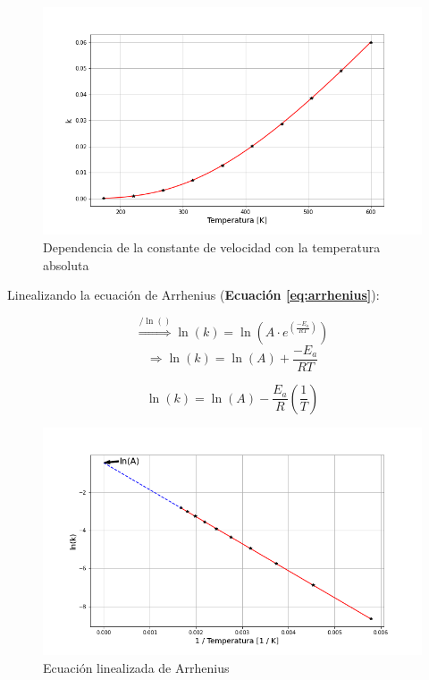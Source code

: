             \begin{figure}
                \centering
                \includegraphics[width=.7\textwidth]{img/graficos/arrhenius_exp.png}
                \caption{Dependencia de la constante de velocidad con la temperatura absoluta}
                \label{fig:arrhenius_exp}
            \end{figure}
            
            Linealizando la ecuación de Arrhenius (\textbf{Ecuación \ref{eq:arrhenius}}):
            
            \[\overset{/ \ln({})}{\Rightarrow} \ln({k}) = \ln({A\cdot e^{\left ( \frac{-E_{a}}{RT} \right )}})\]
            \[\Rightarrow \ln({k}) = \ln({A}) + \frac{-E_{a}}{RT}\]
            
            \begin{equation}
            \label{eq:arrhenius_lineal}
                \ln({k}) = \ln({A}) - \frac{E_{a}}{R} \left ( \frac{1}{T} \right )
            \end{equation}
            
            \begin{figure}
                \centering
                \includegraphics[width=.7\textwidth]{img/graficos/arrhenius_lineal.png}
                \caption{Ecuación linealizada de Arrhenius}
                \label{fig:arrhenius_lineal}
            \end{figure}
            
